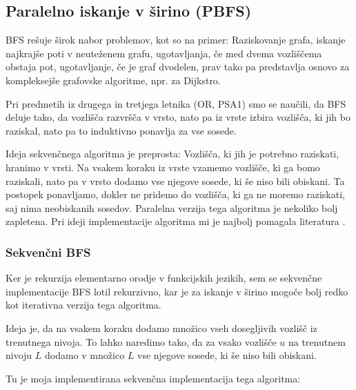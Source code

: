 \documentclass[mat1, tisk]{fmfdelo}
\begin{document}
\subsection{Paralelno iskanje v širino (PBFS)}

BFS rešuje širok nabor problemov, kot so na primer: Raziskovanje grafa, iskanje najkrajše poti v neuteženem grafu, 
ugotavljanja, če med dvema vozliščema obstaja pot, ugotavljanje, če je graf dvodelen, prav tako pa predstavlja osnovo
za kompleksejše grafovske algoritme, npr. za Dijkstro.

Pri predmetih iz drugega in tretjega letnika (OR, PSA1) smo se naučili, da BFS deluje tako, da vozlišča razvršča
v vrsto, nato pa iz vrste izbira vozlišča, ki jih bo raziskal, nato pa to induktivno ponavlja za vse sosede.

Ideja sekvenčnega algoritma je preprosta: Vozlišča, ki jih je potrebno raziskati, hranimo v vrsti. Na vsakem koraku
iz vrste vzamemo vozlišče, ki ga bomo raziskali, nato pa v vrsto dodamo vse njegove sosede, ki še niso bili obiskani.
Ta postopek ponavljamo, dokler ne pridemo do vozlišča, ki ga ne moremo raziskati, saj nima neobiskanih sosedov.
Paralelna verzija tega algoritma je nekoliko bolj zapletena. Pri ideji implementacije algoritma mi je najbolj pomagala
literatura \cite{spaa2010}.

\subsubsection{Sekvenčni BFS}

Ker je rekurzija elementarno orodje v funkcijskih jezikih, sem se sekvenčne implementacije BFS lotil rekurzivno, kar
je za iskanje v širino mogoče bolj redko kot iterativna verzija tega algoritma. 

Ideja je, da na vsakem koraku dodamo množico vseh dosegljivih vozlišč iz trenutnega nivoja. To lahko naredimo tako, da
za vsako vozlišče $u$ na trenutnem nivoju $L$ dodamo v množico $L$ vse njegove sosede, ki še niso bili obiskani.

Tu je moja implementirana sekvenčna implementacija tega algoritma:
\end{document}

